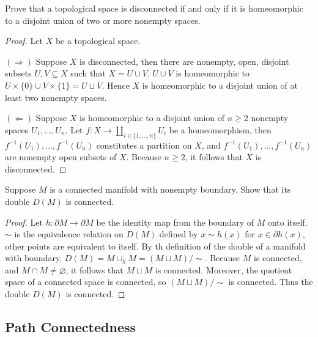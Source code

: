 \begin{exercise}{4.5}
    Prove that a topological space is disconnected if and only if it is homeomorphic to a disjoint union of two or more nonempty spaces.
\end{exercise}

\begin{proof}
    Let $X$ be a topological space.

    $(\Rightarrow)$ Suppose $X$ is disconnected, then there are nonempty, open, disjoint subsets $U, V\subseteq X$ such that $X = U\cup V$. $U\cup V$ is homeomorphic to $U\times\{0\} \cup V\times\{1\} = U\sqcup V$. Hence $X$ is homeomorphic to a disjoint union of at least two nonempty spaces.

    $(\Leftarrow)$ Suppose $X$ is homeomorphic to a disjoint union of $n\geq 2$ nonempty spaces $U_{1}, \ldots, U_{n}$. Let $f: X\to \coprod_{i\in \{1,\ldots,n\}}U_{i}$ be a homeomorphism, then $f^{-1}(U_{1}), \ldots, f^{-1}(U_{n})$ constitutes a partition on $X$, and $f^{-1}(U_{1}), \ldots, f^{-1}(U_{n})$ are nonempty open subsets of $X$. Because $n\geq 2$, it follows that $X$ is disconnected.
\end{proof}

\begin{exercise}{4.10}
    Suppose $M$ is a connected manifold with nonempty boundary. Show that its double $D(M)$ is connected.
\end{exercise}

\begin{proof}
    Let $h: \partial M\to \partial M$ be the identity map from the boundary of $M$ onto itself. $\sim$ is the equivalence relation on $D(M)$ defined by $x\sim h(x)$ for $x\in\partial h(x)$, other points are equivalent to itself. By th definition of the double of a manifold with boundary, $D(M) = M\cup_{h}M = (M\sqcup M)/\sim$. Because $M$ is connected, and $M\cap M\ne\varnothing$, it follows that $M\sqcup M$ is connected. Moreover, the quotient space of a connected space is connected, so $(M\sqcup M)/\sim$ is connected. Thus the double $D(M)$ is connected.
\end{proof}

\subsection*{Path Connectedness}

